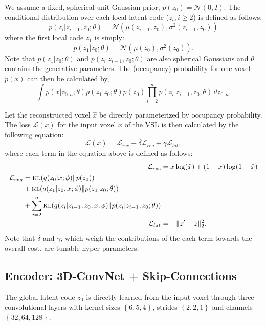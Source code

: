 \documentclass[10pt,twocolumn,letterpaper]{article}
\begin{document}
We assume a fixed, spherical unit Gaussian prior, $ p(z_0)=\mathcal{N}(0,I)$. The conditional distribution over each local latent code ($z_i,i\geq 2$) is defined as follows:
\begin{equation}
p(z_i|z_{i-1},z_0;\theta)=\mathcal{N}(\mu(z_{i-1},z_0),\sigma^2(z_{i-1},z_0))
\end{equation}
where the first local code $z_1$ is simply:
\begin{equation}
p(z_1|z_0;\theta)=\mathcal{N}(\mu(z_0),\sigma^2(z_0)).
\end{equation}
Note that $p(z_1|z_0;\theta)$ and $p(z_i|z_{i-1},z_0;\theta)$ are also spherical Gaussians and $\theta$ contains the generative parameters.
The (occupancy) probability for one voxel $p(x)$ can then be calculated by,
\begin{equation}
\int p(x|z_{0:n};\theta)p(z_1|z_0;\theta)p(z_0)\prod_{i=2}^n p(z_i|z_{i-1},z_0;\theta)\, dz_{0:n}.
\end{equation}

Let the reconstructed voxel $\hat{x}$ be directly parameterized by occupancy probability. The loss $\mathcal{L}(x)$ for the input voxel $x$ of the VSL is then calculated by the following equation:
\begin{equation}
\label{eq:loss}
\mathcal{L}(x)=\mathcal{L}_{rec}+\delta\mathcal{L}_{reg}+\gamma \mathcal{L}_{lat},
\end{equation}
where each term in the equation above is defined as follows:
\begin{align}
\mathcal{L}_{rec} &= x\log(\hat{x})+(1-x)\log(1-\hat{x}) \\
\begin{split}
\mathcal{L}_{reg} &= \text{{\scshape kl}}(q(z_0|x;\phi)\|p(z_0))\\
&+\text{{\scshape kl}}(q(z_1|z_0,x;\phi)\|p(z_1|z_0;\theta)) \\
&+\sum_{i=2}^n\text{{\scshape kl}}(q(z_i|z_{i-1},z_0,x;\phi)\|p(z_i|z_{i-1},z_0;\theta))
\end{split}
\\
\mathcal{L}_{lat} &= -\|z'-z \|^2_2.
\end{align}
Note that $\delta$ and $\gamma$, which weigh the contributions of the each term towards the overall cost, are tunable hyper-parameters.

\subsection{Encoder: 3D-ConvNet + Skip-Connections}
\label{subsec:encoder}
The global latent code $z_0$ is directly learned from the input voxel through three convolutional layers with kernel sizes $\left\{6,5,4\right\}$, strides $\left\{2,2,1 \right\}$ and channels $\left\{32,64,128\right\}$.
\end{document}

